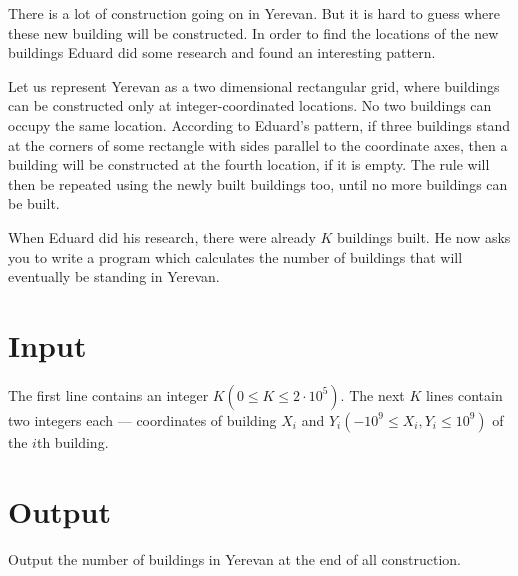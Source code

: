 

There is a lot of construction going on in Yerevan.
But it is hard to guess where these new building will be constructed.
In order to find the locations of the new buildings Eduard did some research and found an interesting pattern.

Let us represent Yerevan as a two dimensional rectangular grid, where buildings can be constructed only at integer-coordinated locations.
No two buildings can occupy the same location.
According to Eduard's pattern, if three buildings stand at the corners of some rectangle with sides parallel to the coordinate axes, then a building will be constructed at the fourth location, if it is empty.
The rule will then be repeated using the newly built buildings too, until no more buildings can be built.

When Eduard did his research, there were already $K$ buildings built.
He now asks you to write a program which calculates the number of buildings that will eventually be standing in Yerevan.



\section*{Input}
The first line contains an integer $K (0 \leq K \leq 2 \cdot 10^5)$.
The next $K$ lines contain two integers each — coordinates of building $X_i$ and $Y_i (−10^9 \leq X_i, Y_i \leq 10^9)$ of the $i$th building.

\section*{Output}
Output the number of buildings in Yerevan at the end of all construction.
